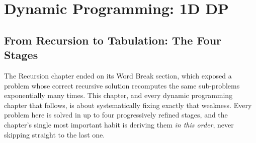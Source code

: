\chapter{Dynamic Programming: 1D DP}

\section{From Recursion to Tabulation: The Four Stages}
\label{sec:dp-intro}

The Recursion chapter ended on its Word Break section, which exposed
a problem whose correct recursive solution recomputes
the same sub-problems exponentially many times. This chapter, and every
dynamic programming chapter that follows, is about systematically fixing
exactly that weakness. Every problem here is solved in up to four
progressively refined stages, and the chapter's single most important
habit is deriving them \emph{in this order}, never skipping straight to
the last one.

